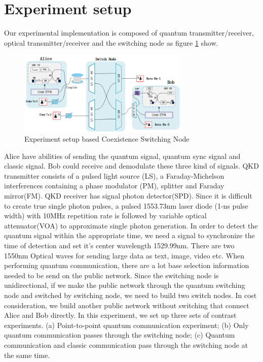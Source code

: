 \documentclass[letterpaper,10pt]{article}
\begin{document}
\section{Experiment setup}
Our experimental implementation is composed of quantum transmitter/receiver, optical transmitter/receiver and the switching node as figure \ref{Fig:experiment_of_switching_node} show.
\begin{figure}
 \centering
 \includegraphics[height= 4cm,width=.6\linewidth]{experiment_of_switching_node}
 \caption{Experiment setup based Coexistence Switching Node}
 \label{Fig:experiment_of_switching_node}
\end{figure}
Alice have abilities of sending the quantum signal, quantum sync signal and classic signal. Bob could receive and demodulate these three kind of signals. QKD transmitter consists of a pulsed light source (LS), a Faraday-Michelson interferences containing a phase modulator (PM), splitter and Faraday mirror(FM). QKD receiver has signal photon detector(SPD). Since it is difficult to create true single photon pulses, a pulsed 1553.73nm laser diode (1-ns pulse width) with 10MHz repetition rate is followed by variable optical attenuator(VOA) to approximate single photon generation. In order to detect the quantum signal within the appropriate time, we need a signal to synchronize the time of detection and set it's center wavelength 1529.99nm. There are two 1550nm Optical waves for sending large data as text, image, video etc. When performing quantum communication, there are a lot base selection information needed to be send on the public network. Since the switching node is unidirectional, if we make the public network through the quantum switching node and switched by switching node, we need to build two switch nodes. In cost consideration, we build another public network without switching  that connect Alice and Bob directly. In this experiment, we set up three sets of contrast experiments. (a) Point-to-point quantum communication experiment; (b) Only quantum communication passes through the switching node; (c) Quantum communication and classic communication pass through the switching node at the same time.
\end{document}
